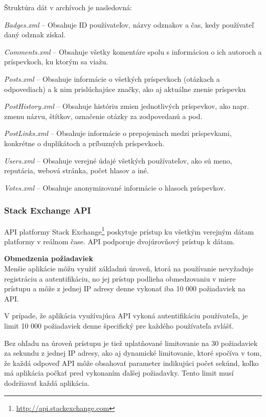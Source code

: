 Štruktúra dát v archívoch je nasledovná:

\begin{my_itemize}
  \item{\textit{Badges.xml} -- Obsahuje ID používateľov, názvy odznakov a čas, kedy používateľ daný odznak získal.}
  \item{\textit{Comments.xml} -- Obsahuje všetky komentáre spolu s informáciou o ich autoroch a príspevkoch, ku ktorým sa viažu.}
  \item{\textit{Posts.xml} -- Obsahuje informácie o všetkých príspevkoch (otázkach a odpovediach) a k nim prislúchajúce značky, ako aj aktuálne znenie príspevku}
  \item{\textit{PostHistory.xml} -- Obsahuje históriu zmien jednotlivých príspevkov, ako napr. zmenu názvu, štítkov, označenie otázky za zodpovedanú a pod.}
  \item{\textit{PostLinks.xml} -- Obsahuje informácie o prepojeniach medzi príspevkami, konkrétne o duplikátoch a príbuzných príspevkoch.}
  \item{\textit{Users.xml} -- Obsahuje verejné údajé všetkých používateľov, ako sú meno, reputácia, webová stránka, počet hlasov a iné.}
  \item{\textit{Votes.xml} -- Obsahuje anonymizované informácie o hlasoch príspevkov.}
\end{my_itemize}


\subsubsection{Stack Exchange API}

API platformy Stack Exchange\footnote{\url{http://api.stackexchange.com}} poskytuje prístup ku všetkým verejným dátam
platformy v reálnom čase. API podporuje dvojúrovňový prístup k dátam.

\textbf{Obmedzenia požiadaviek}\\
Menšie aplikácie môžu využiť základnú úroveň, ktorá na používanie nevyžaduje registráciu a autentifikáciu,
no jej prístup podlieha obmedzovaniu v miere prístupu a môže z jednej IP adresy denne vykonať iba 10 000 požiadaviek na API.

V prípade, že aplikácia využívajúca API vykoná autentifikáciu používateľa, je limit 10 000 požiadaviek denne špecifický
pre každého používateľa zvlášť.

Bez ohľadu na úroveň prístupu je tiež uplatňované limitovanie na 30 požiadaviek za sekundu z jednej IP adresy, ako aj
dynamické limitovanie, ktoré spočíva v tom, že každá odpoveď API môže obsahovať parameter indikujúci počet sekúnd, koľko
má aplikácia počkať pred vykonaním ďalšej požiadavky. Tento limit musí dodržiavať každá aplikácia.

